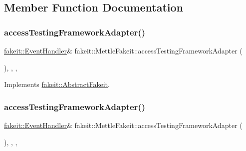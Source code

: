 \subsection{Member Function Documentation}
\mbox{\label{classfakeit_1_1MettleFakeit_a6bedc435877e97e0b6095a9e5f1508cb}} 
\subsubsection{\texorpdfstring{accessTestingFrameworkAdapter()}{accessTestingFrameworkAdapter()}\hspace{0.1cm}{\footnotesize\ttfamily [1/2]}}
{\footnotesize\ttfamily \mbox{\hyperlink{structfakeit_1_1EventHandler}{fakeit\+::\+Event\+Handler}}\& fakeit\+::\+Mettle\+Fakeit\+::access\+Testing\+Framework\+Adapter (\begin{DoxyParamCaption}{ }\end{DoxyParamCaption})\hspace{0.3cm}{\ttfamily [inline]}, {\ttfamily [override]}, {\ttfamily [protected]}, {\ttfamily [virtual]}}



Implements \mbox{\hyperlink{classfakeit_1_1AbstractFakeit_a9476180a503524d49d1978fbbc125b01}{fakeit\+::\+Abstract\+Fakeit}}.

\mbox{\label{classfakeit_1_1MettleFakeit_a6bedc435877e97e0b6095a9e5f1508cb}} 
\subsubsection{\texorpdfstring{accessTestingFrameworkAdapter()}{accessTestingFrameworkAdapter()}\hspace{0.1cm}{\footnotesize\ttfamily [2/2]}}
{\footnotesize\ttfamily \mbox{\hyperlink{structfakeit_1_1EventHandler}{fakeit\+::\+Event\+Handler}}\& fakeit\+::\+Mettle\+Fakeit\+::access\+Testing\+Framework\+Adapter (\begin{DoxyParamCaption}{ }\end{DoxyParamCaption})\hspace{0.3cm}{\ttfamily [inline]}, {\ttfamily [override]}, {\ttfamily [protected]}, {\ttfamily [virtual]}}



